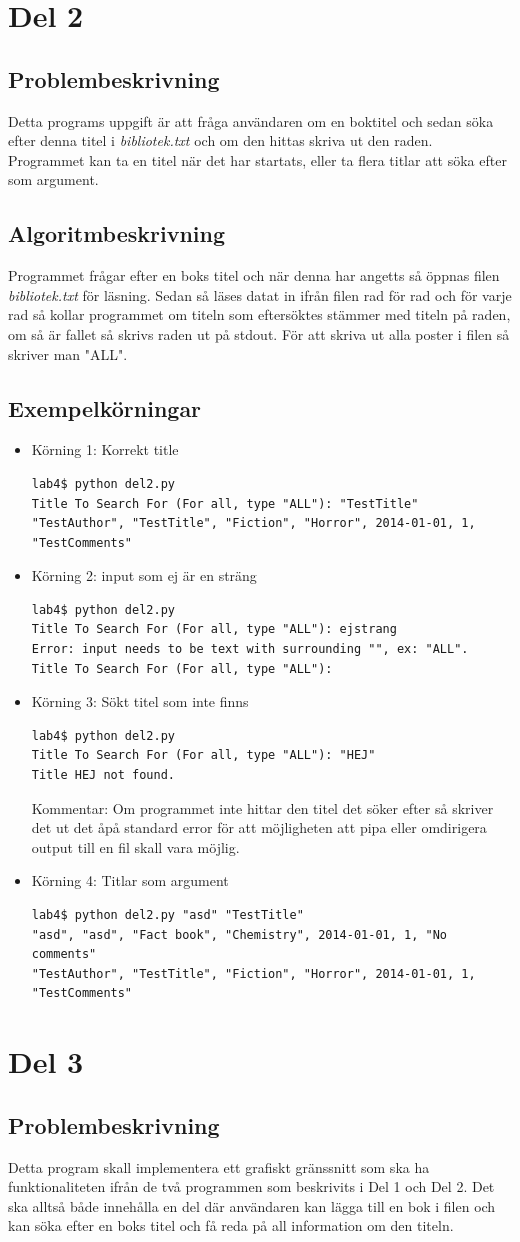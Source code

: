 \documentclass[11pt, titlepage, oneside, a4paper]{article}
\newcommand{\Section}[1]{\section{#1}\vspace{-8pt}}
\newcommand{\Subsection}[1]{\vspace{-4pt}\subsection{#1}\vspace{-8pt}}
\begin{document}
	\Section{Del 2}
		\Subsection{Problembeskrivning}
		Detta programs uppgift är att fråga användaren om en boktitel och sedan söka efter denna titel i \emph{bibliotek.txt} och om den hittas 
		skriva ut den raden. Programmet kan ta en titel när det har startats, eller ta flera titlar att söka efter som argument.
		\Subsection{Algoritmbeskrivning}
		Programmet frågar efter en boks titel och när denna har angetts så öppnas filen \emph{bibliotek.txt} för läsning.
		Sedan så läses datat in ifrån filen rad för rad och för varje rad så kollar programmet om titeln som eftersöktes stämmer med titeln på raden,
		om så är fallet så skrivs raden ut på stdout.
		För att skriva ut alla poster i filen så skriver man "ALL".
		\Subsection{Exempelkörningar}
		\begin{itemize}
		 \item Körning 1: Korrekt title
		 \subitem \begin{lstlisting}
lab4$ python del2.py 
Title To Search For (For all, type "ALL"): "TestTitle"
"TestAuthor", "TestTitle", "Fiction", "Horror", 2014-01-01, 1, "TestComments"
\end{lstlisting}
		 \item Körning 2: input som ej är en sträng
		 \subitem \begin{lstlisting}
lab4$ python del2.py 
Title To Search For (For all, type "ALL"): ejstrang
Error: input needs to be text with surrounding "", ex: "ALL".
Title To Search For (For all, type "ALL"): 
		\end{lstlisting}
		\item Körning 3: Sökt titel som inte finns
		 \subitem \begin{lstlisting}
lab4$ python del2.py
Title To Search For (For all, type "ALL"): "HEJ"
Title HEJ not found.
		\end{lstlisting}
		Kommentar: Om programmet inte hittar den titel det söker efter så skriver det ut det åpå standard error för att möjligheten att pipa eller 
		omdirigera output till en fil skall vara möjlig.
		\item Körning 4: Titlar som argument
		 \subitem \begin{lstlisting}
lab4$ python del2.py "asd" "TestTitle"
"asd", "asd", "Fact book", "Chemistry", 2014-01-01, 1, "No comments"
"TestAuthor", "TestTitle", "Fiction", "Horror", 2014-01-01, 1, "TestComments"
		\end{lstlisting}
		\end{itemize}
		
	\Section{Del 3}
		\Subsection{Problembeskrivning}
		Detta program skall implementera ett grafiskt gränssnitt som ska ha funktionaliteten ifrån de två programmen som beskrivits i 
		Del 1 och Del 2. Det ska alltså både innehålla en del där användaren kan lägga till en bok i filen och kan söka efter en boks titel och få 
		reda på all information om den titeln.
		
\end{document}
